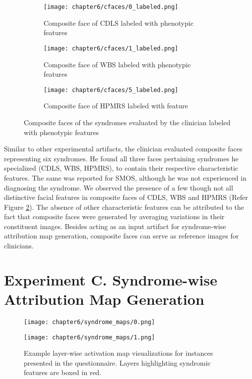 \documentclass[../report.tex]{subfiles}
\begin{document}
\begin{figure}[H]
	\centering
	\begin{subfigure}[t]{0.8\textwidth}
		\centering
		\hspace{-0.5cm}
		\texttt{[image: chapter6/cfaces/0\_labeled.png]}
		\caption{Composite face of CDLS labeled with phenotypic features}
	\end{subfigure}
	\begin{subfigure}[t]{0.8\textwidth}
		\centering
		\texttt{[image: chapter6/cfaces/1\_labeled.png]}
		\caption{Composite face of WBS labeled with phenotypic features}
	\end{subfigure}
	\begin{subfigure}[t]{0.8\textwidth}
		\centering
		\texttt{[image: chapter6/cfaces/5\_labeled.png]}
		\caption{Composite face of HPMRS labeled with feature}
		\label{sfig_diff_3}
	\end{subfigure}
	\caption{Composite faces of the syndromes evaluated by the clinician labeled with phenotypic features}
	\label{fig_comp_lab}
\end{figure}
Similar to other experimental artifacts, the clinician evaluated composite faces representing six syndromes. He found all three faces pertaining syndromes he specialized (CDLS, WBS, HPMRS), to contain their respective characteristic features. The same was reported for SMOS, although he was not experienced in diagnosing the syndrome. We observed the presence of a few though not all distinctive facial features in composite faces of CDLS, WBS and HPMRS (Refer Figure \ref{fig_comp_lab}). The absence of other characteristic features can be attributed to the fact that composite faces were generated by averaging variations in their constituent images. Besides acting as an input artifact for syndrome-wise attribution map generation, composite faces can serve as reference images for clinicians.

    \section{Experiment C. Syndrome-wise Attribution Map Generation}
    
    
    
    
    
    
        \begin{sidewaysfigure}
    	\texttt{[image: chapter6/syndrome\_maps/0.png]}
    	
    	\texttt{[image: chapter6/syndrome\_maps/1.png]}
    	
    	\caption[Example layer-wise activation map visualizations for instances presented in the questionnaire]{Example layer-wise activation map visualizations for instances presented in the questionnaire. Layers highlighting syndromic features are boxed in red.}
    	\label{fig_layer_quest}	
    	\end{sidewaysfigure}
    
\end{document}
